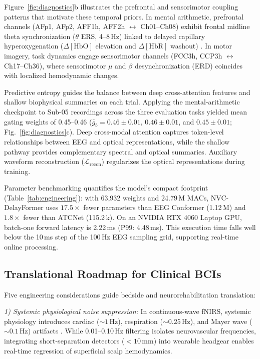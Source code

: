 \documentclass[journal]{IEEEtran}
\begin{document}
Figure~\ref{fig:diagnostics}b illustrates the prefrontal and sensorimotor coupling patterns that motivate these temporal priors. In mental arithmetic, prefrontal channels (AFp1, AFp2, AFF1h, AFF2h $\leftrightarrow$ Ch01--Ch08) exhibit frontal midline theta synchronization ($\theta$ ERS, 4--8\,Hz) linked to delayed capillary hyperoxygenation ($\Delta[\mathrm{HbO}]$ elevation and $\Delta[\mathrm{HbR}]$ washout) \cite{attwell2010glial, iadecola2004neurovascular, gevins1997high}. In motor imagery, task dynamics engage sensorimotor channels (FCC3h, CCP3h $\leftrightarrow$ Ch17--Ch36), where sensorimotor $\mu$ and $\beta$ desynchronization (ERD) \cite{pfurtscheller1999event, mcfarland2000mu} coincides with localized hemodynamic changes.

Predictive entropy guides the balance between deep cross-attention features and shallow biophysical summaries on each trial. Applying the mental-arithmetic checkpoint to Sub-05 recordings across the three evaluation tasks yielded mean gating weights of 0.45--0.46 ($\bar{g}_b = 0.46 \pm 0.01$, $0.46 \pm 0.01$, and $0.45 \pm 0.01$; Fig.~\ref{fig:diagnostics}c). Deep cross-modal attention captures token-level relationships between EEG and optical representations, while the shallow pathway provides complementary spectral and optical summaries. Auxiliary waveform reconstruction ($\mathcal{L}_{\mathrm{recon}}$) regularizes the optical representations during training.

Parameter benchmarking quantifies the model's compact footprint (Table~\ref{tab:engineering}): with 63,932 weights and 24.79\,M MACs, NVC-DelayFormer uses $17.5\times$ fewer parameters than EEG Conformer (1.12\,M) and $1.8\times$ fewer than ATCNet (115.2\,k). On an NVIDIA RTX 4060 Laptop GPU, batch-one forward latency is 2.22\,ms (P99: 4.48\,ms). This execution time falls well below the 10\,ms step of the 100\,Hz EEG sampling grid, supporting real-time online processing.

\subsection{Translational Roadmap for Clinical BCIs}
Five engineering considerations guide bedside and neurorehabilitation translation:

\textit{1) Systemic physiological noise suppression:} In continuous-wave fNIRS, systemic physiology introduces cardiac ($\sim 1$\,Hz), respiration ($\sim 0.25$\,Hz), and Mayer wave ($\sim 0.1$\,Hz) artifacts \cite{scholkmann2014review}. While 0.01--0.10\,Hz filtering isolates neurovascular frequencies, integrating short-separation detectors ($<10$\,mm) into wearable headgear enables real-time regression of superficial scalp hemodynamics.
\end{document}
